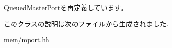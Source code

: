 \hyperlink{classQueuedMasterPort_ae4e2ec83c21e5a331cecc31d84b2dbb7}{QueuedMasterPort}を再定義しています。

このクラスの説明は次のファイルから生成されました:\begin{DoxyCompactItemize}
\item 
mem/\hyperlink{mport_8hh}{mport.hh}\end{DoxyCompactItemize}
